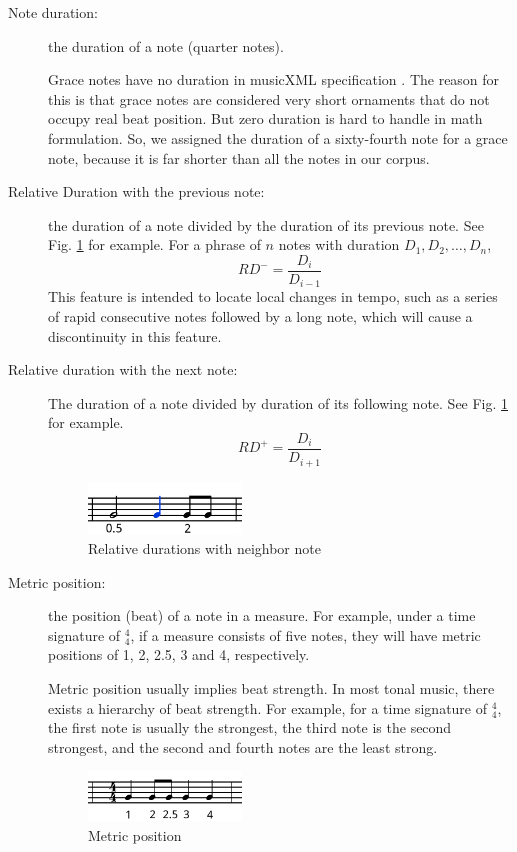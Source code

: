 \begin{description}
         
         \item [Note duration:] the duration of a note (quarter notes). 

            Grace notes have no duration in musicXML specification \cite{musicxml}. The reason for this is that grace notes are considered very short ornaments that do not occupy real beat position. But zero duration is hard to handle in math formulation. So, we assigned the duration of a sixty-fourth note for a grace note, because it is far shorter than all the notes in our corpus.
         \item [Relative Duration with the previous note:] the duration of a note divided by the duration of its previous note. See Fig. \ref{fig:duration} for example.
For a phrase of $n$ notes with duration $D_1, D_2, \dots, D_n$, $$RD^- = \frac{D_i}{D_{i-1}} $$             This feature is intended to locate local changes in tempo, such as a series of rapid consecutive notes followed by a long note, which will cause a discontinuity in this feature.
         \item [Relative duration with the next note:] The duration of a note divided by duration of its following note. See Fig. \ref{fig:duration} for example.
$$RD^+ = \frac{D_i}{D_{i+1}} $$ 

      \begin{figure}[tp]
         \begin{center}
            \includegraphics[width=0.4\textwidth]{fig/duration}
         \end{center}
         \caption{Relative durations with neighbor note}
         \label{fig:duration}
      \end{figure}
   \item [Metric position:] the position (beat) of a note in a measure. For example, under a time signature of $^4_4$, if a measure consists of five notes, they will have metric positions of 1, 2, 2.5, 3 and 4, respectively. 
      
      Metric position usually implies beat strength. In most tonal music, there exists a hierarchy of beat strength. For example, for a time signature of $^4_4$, the first note is usually the strongest, the third note is the second strongest, and the second and fourth notes are the least strong. %

   \begin{figure}[tp]
      \begin{center}
         \includegraphics[width=0.4\textwidth]{fig/metrical}
      \end{center}
      \caption{Metric position}
      \label{fig:metrical}
   \end{figure}
      \end{description}

